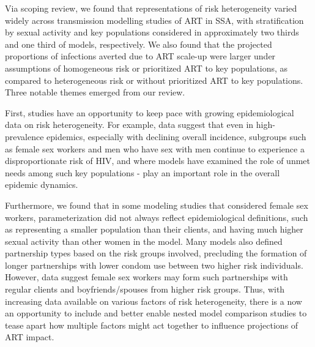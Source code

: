 Via scoping review, we found that representations of risk heterogeneity varied widely across
transmission modelling studies of ART in SSA, with
stratification by sexual activity and key populations considered in approximately
two thirds and one third of models, respectively.
We also found that the projected proportions of infections averted due to ART scale-up were
larger under assumptions of homogeneous risk or prioritized ART to key populations,
as compared to heterogeneous risk or without prioritized ART to key populations.
Three notable themes emerged from our review.
\par %
First, studies have an opportunity to keep pace with growing epidemiological data on risk heterogeneity.
For example, data suggest that even in high-prevalence epidemics, especially with declining overall incidence,
subgroups such as female sex workers and men who have sex with men continue to experience a disproportionate
risk of HIV, and where models have examined the role of unmet needs among such key populations - play 
an important role in the overall epidemic dynamics. %

Furthermore, we found that in some modeling studies that considered female sex workers,
parameterization did not always
reflect epidemiological definitions, such as
representing a smaller population than their clients,
and having much higher sexual activity than other women in the model. %
\cite{Watts2010,Scorgie2012}
Many models also defined partnership types based on the risk groups involved, %
precluding the formation of longer partnerships with lower condom use between two higher risk individuals. %
However, data suggest female sex workers may form such partnerships with regular clients
and boyfriends/spouses from higher risk groups.\cite{Scorgie2012}  %
Thus, with increasing data available on various factors of risk heterogeneity, 
there is a now an opportunity to include and better enable nested model comparison studies 
to tease apart how multiple factors might act together to influence projections of ART impact. 
\cite{Dodd2010,Hontelez2013}

